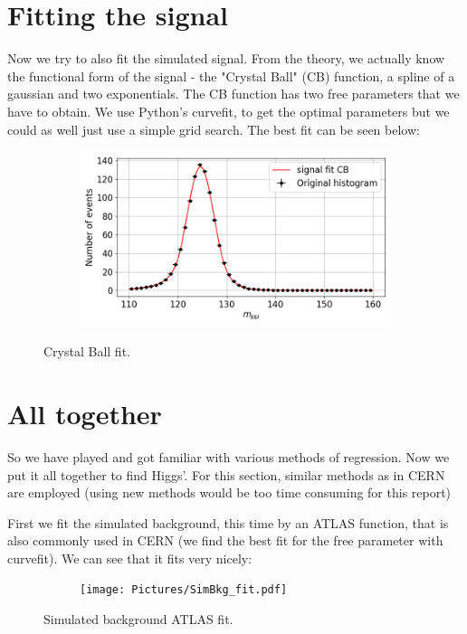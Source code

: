 \documentclass{article}
\begin{document}
\section*{Fitting the signal}
Now we try to also fit the simulated signal.
From the theory, we actually know the functional form of the signal - the "Crystal Ball" (CB) function, a spline of a gaussian and two exponentials. The CB function has two free parameters that we have to obtain. We use Python's curvefit, to get the optimal parameters but we could as well just use a simple grid search.
The best fit can be seen below:
\begin{figure}[H]
\centering
\begin{subfigure}{.49\textwidth}
\includegraphics[width=\linewidth]{Pictures/CBfit.png}
\end{subfigure}
\caption*{Crystal Ball fit.}
\label{fig:CBfit}
\end{figure}

\section*{All together}
So we have played and got familiar with various methods of regression. Now we put it all together to find Higgs'. For this section, similar methods as in CERN are employed (using new methods would be too time consuming for this report)

First we fit the simulated background, this time by an ATLAS function, that is also commonly used in CERN (we find the best fit for the free parameter with curvefit). We can see that it fits very nicely:
\begin{figure}[H]
\centering
\begin{subfigure}{.7\textwidth}
\texttt{[image: Pictures/SimBkg\_fit.pdf]}
\end{subfigure}
\caption*{Simulated background ATLAS fit.}
\end{figure}
\end{document}
